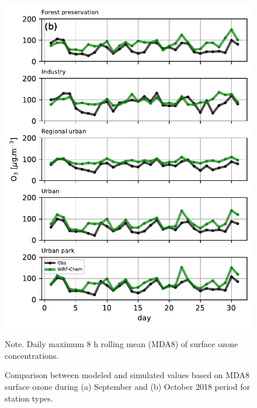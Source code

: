 \begin{figure}[!ht]
\begin{center}
\begin{minipage}{.49\linewidth}
    \includegraphics[width=\linewidth]{fig/mda8_type_oct18.pdf}
  \end{minipage}
  \end{center}
  \caption{Comparison between modeled and simulated values based on MDA8 surface ozone during (a) September and (b) October 2018 period for station types.}
  {\scriptsize Note. Daily maximum 8 h rolling mean (MDA8) of surface ozone concentrations.}
  \label{fig: MDA8_type_current}
\end{figure}

